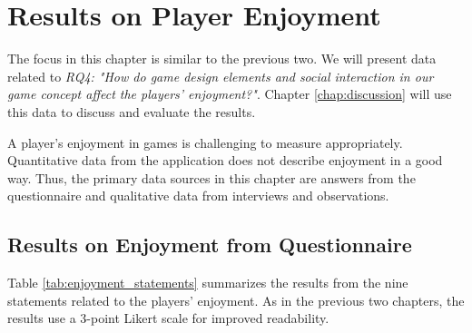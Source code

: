 \section{Results on Player Enjoyment}
\label{chap:player_enjoyment}
The focus in this chapter is similar to the previous two. We will present data related to \textit{RQ4: "How do game design elements and social interaction in our game concept affect the players’ enjoyment?"}. Chapter \ref{chap:discussion} will use this data to discuss and evaluate the results.

A player’s enjoyment in games is challenging to measure appropriately. Quantitative data from the application does not describe enjoyment in a good way. Thus, the primary data sources in this chapter are answers from the questionnaire and qualitative data from interviews and observations.

\subsection{Results on Enjoyment from Questionnaire}
Table \ref{tab:enjoyment_statements} summarizes the results from the nine statements related to the players’ enjoyment. As in the previous two chapters, the results use a 3-point Likert scale for improved readability. 

